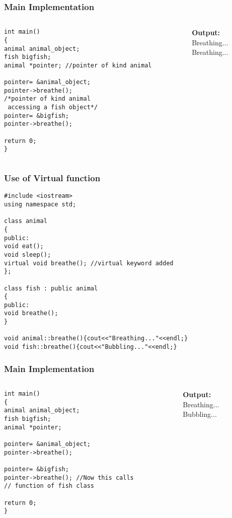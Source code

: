 \documentclass{beamer}
\newtheorem{Key points}{Key points}
\newcommand\Fontviaa{\fontsize{8}{7.2}\selectfont}
\begin{document}
\begin{frame}[fragile]
\frametitle{Main Implementation}
\begin{columns}[onlytextwidth]
    \begin{column}{0.6\textwidth}
      \centering
\begin{lstlisting}
int main()
{
animal animal_object;
fish bigfish;
animal *pointer; //pointer of kind animal

pointer= &animal_object;
pointer->breathe();
/*pointer of kind animal
 accessing a fish object*/
pointer= &bigfish; 
pointer->breathe();

return 0;
}
\end{lstlisting}
\end{column}
\pause    \begin{column}{0.3\textwidth}
      \centering
\textbf{{\color{blue}Output:}} \\Breathing...\\Breathing...\\ 
    \end{column}
\end{columns}
\end{frame}
\begin{frame}[fragile]
\frametitle{Use of Virtual function}
\Fontviaa
\begin{lstlisting}
#include <iostream>
using namespace std;

class animal
{
public:
void eat();
void sleep();
virtual void breathe(); //virtual keyword added
};

class fish : public animal
{
public:
void breathe();
}

void animal::breathe(){cout<<"Breathing..."<<endl;}
void fish::breathe(){cout<<"Bubbling..."<<endl;}
\end{lstlisting}
\end{frame}

\begin{frame}[fragile]
\frametitle{Main Implementation}
\begin{columns}[onlytextwidth]
    \begin{column}{0.6\textwidth}
      \centering
\begin{lstlisting}
int main()
{
animal animal_object;
fish bigfish;
animal *pointer;

pointer= &animal_object;
pointer->breathe();

pointer= &bigfish;
pointer->breathe(); //Now this calls
// function of fish class

return 0;
}
\end{lstlisting}
\end{column}
\pause    \begin{column}{0.3\textwidth}
      \centering
\textbf{{\color{blue}Output:}} \\Breathing...\\Bubbling...\\ 
    \end{column}
\end{columns}

\end{frame}
\end{document}
